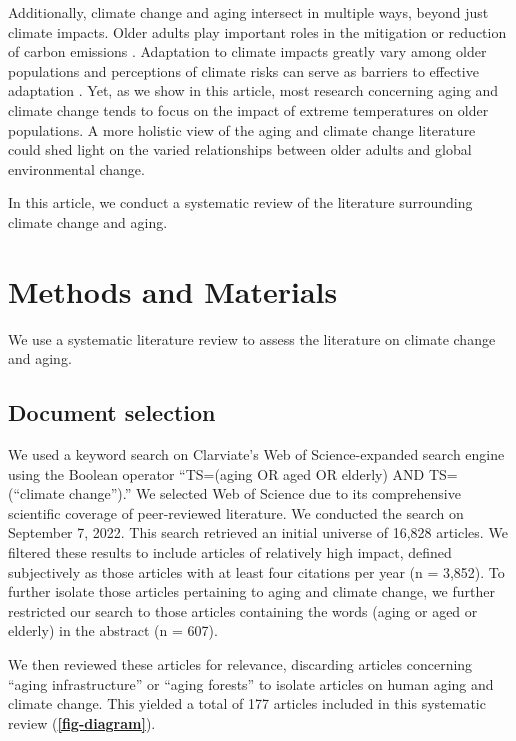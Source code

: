 \documentclass[12pt]{article}
\begin{document}
Additionally, climate change and aging intersect in multiple ways,
beyond just climate impacts. Older adults play important roles in the
mitigation or reduction of carbon emissions
\citep{oneill_global_2010, buchs_who_2013}. Adaptation to climate
impacts greatly vary among older populations
\citep{huang_is_2011, guo_high_2012} and perceptions of climate risks
can serve as barriers to effective adaptation
\citep{hansen_perceptions_2011, abrahamson_perceptions_2008}. Yet, as we
show in this article, most research concerning aging and climate change
tends to focus on the impact of extreme temperatures on older
populations. A more holistic view of the aging and climate change
literature could shed light on the varied relationships between older
adults and global environmental change.

In this article, we conduct a systematic review of the literature
surrounding climate change and aging.

\hypertarget{methods-and-materials}{%
\section{Methods and Materials}\label{methods-and-materials}}

We use a systematic literature review to assess the literature on
climate change and aging.

\hypertarget{document-selection}{%
\subsection{Document selection}\label{document-selection}}

We used a keyword search on Clarviate's Web of Science-expanded search
engine using the Boolean operator ``TS=(aging OR aged OR elderly) AND
TS=(``climate change'').'' We selected Web of Science due to its
comprehensive scientific coverage of peer-reviewed literature. We
conducted the search on September 7, 2022. This search retrieved an
initial universe of 16,828 articles. We filtered these results to
include articles of relatively high impact, defined subjectively as
those articles with at least four citations per year (n = 3,852). To
further isolate those articles pertaining to aging and climate change,
we further restricted our search to those articles containing the words
(aging or aged or elderly) in the abstract (n = 607).

We then reviewed these articles for relevance, discarding articles
concerning ``aging infrastructure'' or ``aging forests'' to isolate
articles on human aging and climate change. This yielded a total of 177
articles included in this systematic review
(\textbf{\autoref{fig-diagram}}).
\end{document}
